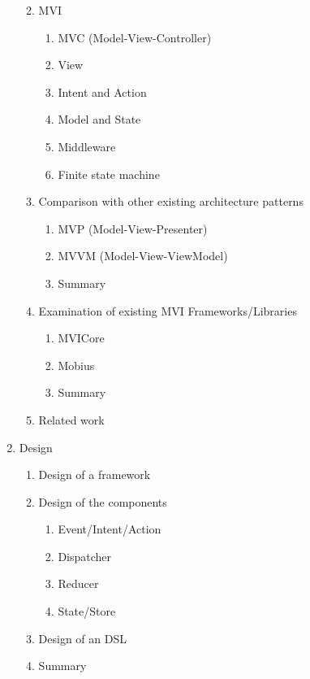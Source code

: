 \begin{enumerate}
\begin{enumerate}
\begin{enumerate}
        \end{enumerate}
        \item MVI
        \begin{enumerate}
            \item MVC (Model-View-Controller)
            \item View
            \item Intent and Action
            \item Model and State
            \item Middleware
            \item Finite state machine
        \end{enumerate}
        \item Comparison with other existing architecture patterns
        \begin{enumerate}
            \item MVP (Model-View-Presenter)
            \item MVVM (Model-View-ViewModel)
            \item Summary
        \end{enumerate}
        \item Examination of existing  MVI Frameworks/Libraries
        \begin{enumerate}
            \item MVICore
            \item Mobius
            \item Summary
        \end{enumerate}
        \item Related work
    \end{enumerate}
    \item Design
    \begin{enumerate}
        \item Design of a framework
        \item Design of the components
        \begin{enumerate}
            \item Event/Intent/Action
            \item Dispatcher
            \item Reducer
            \item State/Store
        \end{enumerate}
        \item Design of an DSL
        \item Summary
    \end{enumerate}

\end{enumerate}

